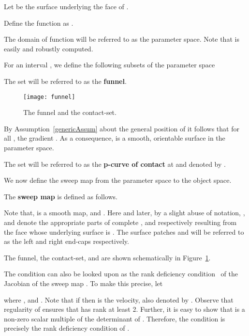 \documentclass{elsart5p}
\begin{document}
Let  be the surface underlying the face  of .

\begin{defn} \label{fDef}
Define the function  as 
.
\end{defn}
The domain of function  will be referred to as the parameter space.  Note that  is easily 
and robustly computed.
\begin{defn} \label{LFRDef}
For an interval , we define the following subsets of the parameter space

\end{defn}
The set  will be referred to as the {\bf funnel}.

\begin{figure}
 \centering
 \texttt{[image: funnel]}
 \caption{The funnel and the contact-set.}
 \label{funnelFig}
\end{figure}

By Assumption~\ref{genericAssum} about the general position of  it follows that for all , the gradient 
.  As a consequence,  is a smooth, orientable surface in the parameter space.

\begin{defn} \label{pcocDef}
The set  will be referred to as the {\bf p-curve of contact} at  and 
denoted by .
\end{defn}

We now define the sweep map from the parameter space to the object space.
\begin{defn} \label{sigmaDef}
The {\bf sweep map} is defined as follows.
 
\end{defn}
Note that,  is a smooth map,  and . 
Here and later, by a slight abuse of notation, ,  and  denote the 
appropriate parts of complete ,  and  respectively 
resulting from the face  whose underlying surface is .
The surface patches  and  will be referred to as the 
left and right end-caps respectively.

The funnel, the contact-set,  and  are shown schematically in Figure~\ref{funnelFig}.

The condition  can also be looked upon as the rank deficiency condition~\cite{jacobian} of the 
Jacobian  of the sweep map .  To make this precise, let

where , 
  and 
. Note that if  then 
 is the velocity, also denoted by .   
Observe that  regularity of  ensures 
that  has rank at least 2.  Further, it is easy to show that 
 is a non-zero scalar multiple of the determinant of .
Therefore, the condition  is precisely the rank deficiency 
condition of .
\end{document}
